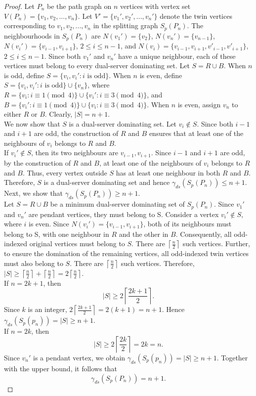 \documentclass{article}
\begin{document}
\begin{proof}
Let $P_n$ be the path graph on $n$ vertices with vertex set $V(P_n)= \{v_1, v_2, ..., v_n\}$. Let $V'= \{v_1', v_2', ..., v_n'\}$ denote the twin vertices corresponding to $v_1, v_2, ..., v_n$ in the splitting graph $S_p(P_n)$. The neighbourhoods in $S_p(P_n)$ are $N(v_1')= \{v_2\}$, $N(v_n')= \{v_{n-1}\}$, $N(v_i')= \{v_{i-1}, v_{i+1}\}$, $2 \le i \le n-1$, and $N(v_i)= \{v_{i-1}, v_{i+1}, v'_{i-1}, v'_{i+1}\}$, $2 \le i \le n-1$. Since both $v_1'$ and $v_n'$ have a unique neighbour, each of these vertices must belong to every dual-server dominating set. Let $S = R \cup B$. When $n$ is odd, define $S=\{v_i, v_i': i \text{ is odd}\}$. When $n$ is even, define $S= \{v_i, v_i': i \text{ is odd}\} \cup \{v_n\}$, where $R= \{v_i: i \equiv1\pmod{4}\} \cup \{v_i': i \equiv3\pmod{4}\}$, and $B= \{v_i': i \equiv1\pmod{4}\} \cup \{v_i: i \equiv3\pmod{4}\}$.  When $n$ is even, assign $v_n$ to either $R$ or $B$. Clearly, $|S| = n + 1$.\\ We now show that $S$ is a dual-server dominating set.  Let $v_i \notin S$. Since both $i-1$ and $i+1$ are odd, the construction of $R$ and $B$ ensures that at least one of the neighbours of $v_i$ belongs to $R$ and $B$. \\ If $v_i' \notin S$, then  its two neighbours are ${v_{i-1}, v_{i+1}}$. Since $i-1$ and $i+1$ are odd, by the construction of $R$ and $B$, at least one of the neighbours of $v_i$ belongs to $R$ and $B$. Thus, every vertex outside $S$ has at least one neighbour in both $R$ and $B$. Therefore, $S$ is a dual-server dominating set and hence $\gamma_{ds}(S_p(P_n)) \le n+1$. \\ Next, we show that $\gamma_{ds}(S_p(P_n)) \geq n+1$.\\ Let $S = R \cup B$ be a minimum dual-server dominating set of $S_p(P_n)$. Since $v_1'$ and $v_n'$ are pendant vertices, they must belong to S. Consider a vertex $v_i' \notin S$, where $i$ is even. Since $N(v_i')= \{v_{i-1}, v_{i+1}\}$, both of its neighbours must belong to S, with one neighbour in $R$ and the other in $B$. Consequently, all odd-indexed original vertices must belong to $S$. There are $\left\lceil \frac{n}{2} \right\rceil$ such vertices. Further, to ensure the domination of the remaining vertices, all odd-indexed twin vertices must also belong to  $S$. There are $\left\lceil \frac{n}{2} \right\rceil$ such vertices. Therefore, $ |S| \ge \left\lceil \frac{n}{2} \right\rceil + \left\lceil \frac{n}{2} \right\rceil = 2 \left\lceil \frac{n}{2} \right\rceil $.\\ If $n= 2k+1$, then \[|S| \ge 2 \left\lceil \frac{2k+1}{2}\right\rceil. \]
Since $k$ is an integer, 
$ 2 \left\lceil \frac{2k+1}{2} \right\rceil = 2(k+1) = n + 1$.
Hence $ \gamma_{ds}(S_p(p_n))= |S| \ge n + 1 $.\\ If $n= 2k$, then \[ |S| \ge 2 \left\lceil \frac{2k}{2} \right\rceil = 2k =n.\] Since $v_n'$ is a pendant vertex, we obtain $ \gamma_{ds}(S_p(p_n))= |S| \ge n + 1 $. Together with the upper bound, it follows that\\ \[\gamma_{ds}(S_p(P_n)) = n+1.\]
\end{proof}
\end{document}
